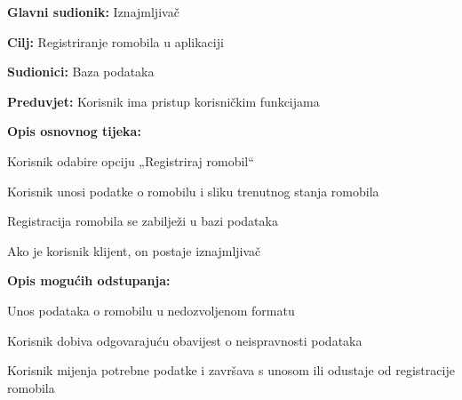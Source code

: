						\noindent {}
						\begin{packed_item}
							
							\item \textbf{Glavni sudionik: }Iznajmljivač
							\item  \textbf{Cilj: }Registriranje romobila u aplikaciji
							\item  \textbf{Sudionici: }Baza podataka
							\item  \textbf{Preduvjet: }Korisnik ima pristup korisničkim funkcijama
							\item  \textbf{Opis osnovnog tijeka:}
							
							\item[] \begin{packed_enum}
								
								\item Korisnik odabire opciju „Registriraj romobil“ 
								\item Korisnik unosi podatke o romobilu i sliku trenutnog stanja romobila 
								\item Registracija romobila se zabilježi u bazi podataka 
								\item Ako je korisnik klijent, on postaje iznajmljivač   
							\end{packed_enum}
							
							\item  \textbf{Opis mogućih odstupanja:}
							
							\item[] \begin{packed_item}
								
								\item[2.a] Unos podataka o romobilu u nedozvoljenom formatu 
								\item[] \begin{packed_enum}
									
									\item Korisnik dobiva odgovarajuću obavijest o neispravnosti podataka 
									\item Korisnik mijenja potrebne podatke i završava s unosom ili odustaje od registracije romobila 
									
								\end{packed_enum}
								
								
							\end{packed_item}
						\end{packed_item}
						\noindent {}
